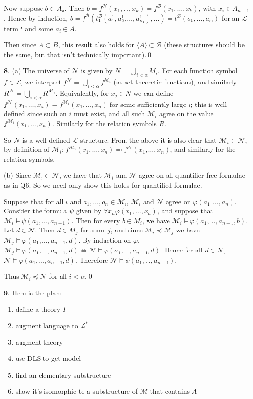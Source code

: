 \documentclass[]{article}
\theoremstyle{custhm}
\theoremstyle{cusdef}
\theoremstyle{custhm}
\theoremstyle{custhm}
\theoremstyle{custhm}
\theoremstyle{custhm}
\theoremstyle{cusdef}
\theoremstyle{remark}
\newcommand{\N}{\mathcal{N}}
\renewcommand{\L}{\mathcal{L}}
\newcommand{\M}{\mathcal{M}}
\renewcommand{\phi}{\varphi}
\begin{document}
Now suppose $b\in A_{n}$. Then $b = f^\N(x_1,\dots,x_k) = f^\mathcal{B}(x_1,\dots,x_k)$, with $x_i\in A_{n-1}$. Hence by induction, $b = f^\mathcal{B}(t_1^\mathcal{B}(a_1^1,a_2^1,\dots,a_{n_1}^1),\dots) = t^\mathcal{B}(a_1,\dots,a_m)$ for an $\L$-term $t$ and some $a_i\in A$.

Then since $A\subset B$, this result also holds for $\langle A\rangle \subset \mathcal{B}$ (these structures should be the same, but that isn't technically important).\qed

\textbf{8}. (a) The universe of $\N$ is given by $N = \bigcup_{i < \alpha} M_i$. For each function symbol $f\in \L$, we interpret $f^\N = \bigcup_{i < \alpha}f^{\M_i}$ (as set-theoretic functions), and similarly $R^{\N} = \bigcup_{i < \alpha}R^{\M_i}$. Equivalently, for $x_j \in N$ we can define $f^{\N}(x_1,\dots,x_n) = f^{\M_i}(x_1,\dots,x_n)$ for some sufficiently large $i$; this is well-defined since such an $i$ must exist, and all such $\M_i$ agree on the value $f^{\M_i}(x_1,\dots,x_n)$. Similarly for the relation symbols $R$.

So $\N$ is a well-defined $\L$-structure. From the above it is also clear that $\M_i\subset \N$, by definition of $\M_i$; $f^{\M_i}(x_1,\dots,x_n)\eqqcolon f^\N(x_1,\dots,x_n)$, and similarly for the relation symbols.

(b) Since $\M_i\subset \N$, we have that $\M_i$ and $\N$ agree on all quantifier-free formulae as in Q6. So we need only show this holds for quantified formulae.

Suppose that for all $i$ and $a_1,\dots,a_n\in \M_i$, $\M_i$ and $\N$ agree on $\phi(a_1,\dots,a_n)$. Consider the formula $\psi$ given by $\forall x_n \phi(x_1,\dots,x_n)$, and suppose that $\M_i \models \psi(a_1,\dots,a_{n-1})$. Then for every $b\in M_i$, we have $\M_i\models \phi(a_1,\dots,a_{n-1},b)$. Let $d\in \N$. Then $d\in M_j$ for some $j$, and since $\M_i\preceq \M_j$ we have $\M_j \models \phi(a_1,\dots,a_{n-1},d)$. By induction on $\phi$, $\M_j\models \phi(a_1,\dots,a_{n-1},d) \iff \N \models \phi(a_1,\dots,a_{n-1},d)$. Hence for all $d\in \N$, $\N\models \phi(a_1,\dots,a_{n-1},d)$. Therefore $\N\models \psi(a_1,\dots,a_{n-1})$.

Thus $\M_i \preceq \N$ for all $i < \alpha$.\qed

\textbf{9}. Here is the plan:
\begin{enumerate}
	\item define a theory $T$
	\item augment language to $\L^\ast$
	\item augment theory
	\item use DLS to get model
	\item find an elementary substructure
	\item show it's isomorphic to a substructure of $\M$ that contains $A$
\end{enumerate}
\end{document}
